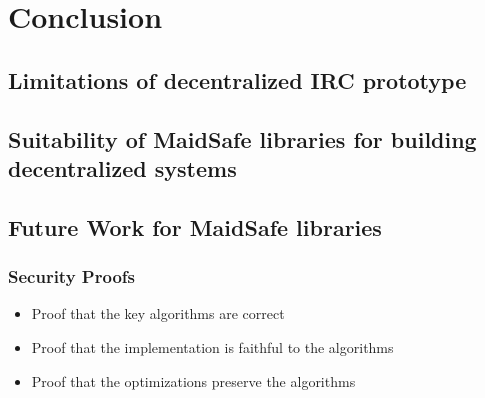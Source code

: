 \chapter{Conclusion}

\section{Limitations of decentralized IRC prototype}

\section{Suitability of MaidSafe libraries for building decentralized systems}

\section{Future Work for MaidSafe libraries}

\subsection{Security Proofs}
\begin{itemize}
	\item Proof that the key algorithms are correct
	\item Proof that the implementation is faithful to the algorithms
	\item Proof that the optimizations preserve the algorithms
\end{itemize}
